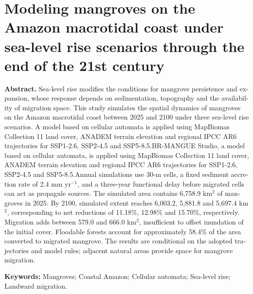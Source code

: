 \documentclass[12pt,a4paper]{article}
\begin{document}
\section*{Modeling mangroves on the Amazon macrotidal coast under sea-level rise scenarios through the end of the 21st century}
\begin{otherlanguage}{english}
\noindent\textbf{Abstract.} Sea-level rise modifies the conditions for mangrove persistence and expansion, whose response depends on sedimentation, topography and the availability of migration space. This study simulates the spatial dynamics of mangroves on the Amazon macrotidal coast between 2025 and 2100 under three sea-level rise scenarios. \ifdefined\VersaoCega A model based on cellular automata is applied using MapBiomas Collection 11 land cover, ANADEM terrain elevation and regional IPCC AR6 trajectories for SSP1-2.6, SSP2-4.5 and SSP5-8.5.\else BR-MANGUE Studio, a model based on cellular automata, is applied using MapBiomas Collection 11 land cover, ANADEM terrain elevation and regional IPCC AR6 trajectories for SSP1-2.6, SSP2-4.5 and SSP5-8.5.\fi\space Annual simulations use 30-m cells, a fixed sediment accretion rate of 2.4 mm yr$^{-1}$, and a three-year functional delay before migrated cells can act as propagule sources. The simulated area contains 6,758.9 km$^2$ of mangroves in 2025. By 2100, simulated extent reaches 6,003.2, 5,881.8 and 5,697.4 km$^2$, corresponding to net reductions of 11.18\%, 12.98\% and 15.70\%, respectively. Migration adds between 579.0 and 666.0 km$^2$, insufficient to offset inundation of the initial cover. Floodable forests account for approximately 58.4\% of the area converted to migrated mangrove. The results are conditional on the adopted trajectories and model rules; adjacent natural areas provide space for mangrove migration.

\noindent\textbf{Keywords:} Mangroves; Coastal Amazon; Cellular automata; Sea-level rise; Landward migration.
\end{otherlanguage}
\end{document}
